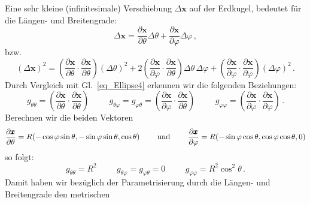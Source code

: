 Eine sehr kleine (infinitesimale) Verschiebung $\Delta \pmb{x}$ auf der Erdkugel, bedeutet f\"ur
die L\"angen- und Breitengrade:
\begin{equation}
       \Delta \pmb{x} = 
       \frac{\partial \pmb{x}}{\partial \theta} \Delta \theta + \frac{\partial \pmb{x}}{\partial \varphi} \Delta \varphi \, ,
\end{equation}
bzw.
\begin{equation}
\label{eq_gthetaphi}
      ( \Delta \pmb{x})^2 = 
       \left( \frac{\partial \pmb{x}}{\partial \theta} \cdot \frac{\partial \pmb{x}}{\partial \theta} \right)
       ( \Delta \theta)^2 + 2 \left( \frac{\partial \pmb{x}}{\partial \varphi} \cdot \frac{\partial \pmb{x}}{\partial \theta} \right)
       \Delta \theta \, \Delta \varphi + \left( \frac{\partial \pmb{x}}{\partial \varphi}\cdot \frac{\partial \pmb{x}}{\partial \varphi}\right)
          (\Delta \varphi )^2 \, .
\end{equation}
Durch Vergleich mit Gl.\ \ref{eq_Ellipse4} erkennen wir die folgenden Beziehungen:
\begin{equation}
       g_{\theta \theta} =   \left( \frac{\partial \pmb{x}}{\partial \theta} \cdot \frac{\partial \pmb{x}}{\partial \theta} \right)
       \hspace{1cm}
       g_{\theta \varphi} = g_{\varphi \theta} =  \left( \frac{\partial \pmb{x}}{\partial \varphi} \cdot \frac{\partial \pmb{x}}{\partial \theta} \right)
       \hspace{1cm}
       g_{\varphi \varphi} = \left( \frac{\partial \pmb{x}}{\partial \varphi}\cdot \frac{\partial \pmb{x}}{\partial \varphi}\right)  \, .
\end{equation}
Berechnen wir die beiden Vektoren
\begin{equation}
       \frac{\partial \pmb{x}}{\partial \theta} = R (- \cos \varphi \sin \theta, - \sin \varphi \sin \theta , \cos \theta)
       \hspace{0.8cm} {\rm und} \hspace{0.8cm} 
       \frac{\partial \pmb{x}}{\partial \varphi} = R (- \sin \varphi \cos \theta, \cos \varphi \cos \theta , 0)
\end{equation}
so folgt:
\begin{equation}
         g_{\theta \theta} = R^2  \hspace{1cm}   g_{\theta \varphi} = g_{\varphi \theta} = 0 
         \hspace{1cm}  g_{\varphi \varphi} = R^2 \cos^2 \theta \, .
\end{equation}
Damit haben wir bez\"uglich der Parametrisierung durch die L\"angen- und Breitengrade den metrischen
